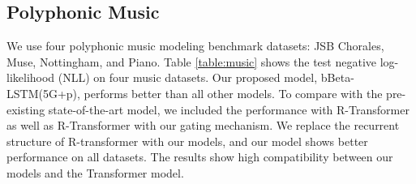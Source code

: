\documentclass[letterpaper]{article} %
\begin{document}
\subsection{Polyphonic Music}
We use four polyphonic music modeling benchmark datasets: JSB Chorales, Muse, Nottingham, and Piano. Table \ref{table:music} shows the test negative log-likelihood (NLL) on four music datasets.
Our proposed model, bBeta-LSTM(5G+p), performs better than all other models. 
To compare with the pre-existing state-of-the-art model, we included the performance with R-Transformer \cite{wang2019rtransf} as well as R-Transformer with our gating mechanism. We replace the recurrent structure of R-transformer with our models, and our model shows better performance on all datasets. The results show high compatibility between our models and the Transformer model.
\end{document}
